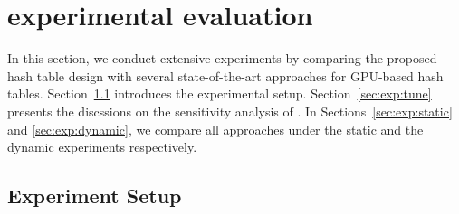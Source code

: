 \section{experimental evaluation}\label{sec:exp}
In this section, we conduct extensive experiments by comparing the proposed hash table design \voter with several state-of-the-art approaches for GPU-based hash tables. 
Section~\ref{sec:exp:setup} introduces the experimental setup. 
Section~\ref{sec:exp:tune} presents the discssions on the sensitivity analysis of \voter.
In Sections~\ref{sec:exp:static} and \ref{sec:exp:dynamic}, we compare all approaches under the static and the dynamic experiments respectively.

\subsection{Experiment Setup}\label{sec:exp:setup}

